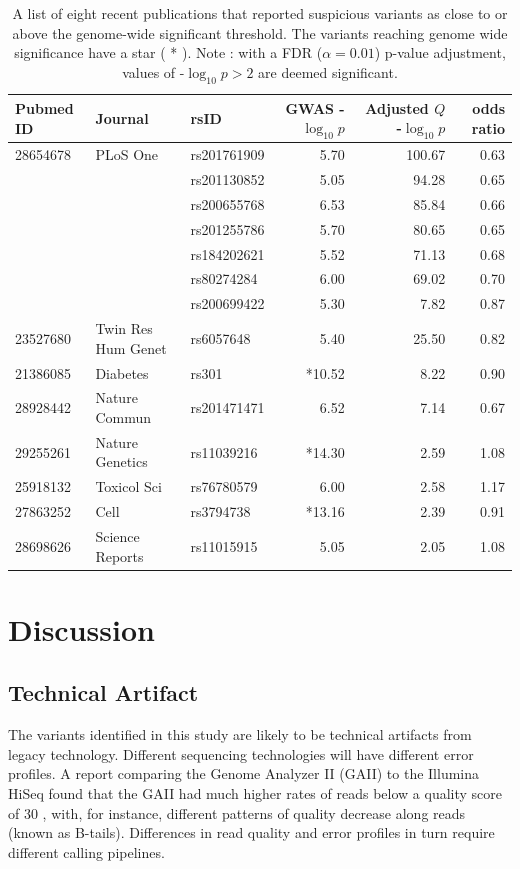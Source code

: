 \documentclass[9pt,lineno]{elife}
\begin{document}
\begin{table}[h]
\begin{tabular}{l l l r r r}
  {Pubmed ID}  & {Journal} & {rsID} & {GWAS -$\log_{10} p$} & {Adjusted $Q$ -$\log_{10} p$} & {odds ratio}     \\ \hline
 28654678	& PLoS One	& rs201761909	& 5.70	& 100.67 & 0.63\\
 	& 		& rs201130852	& 5.05	& 94.28 & 0.65\\
 	& 		& rs200655768	& 6.53	& 85.84 & 0.66\\
 	& 		& rs201255786	& 5.70	& 80.65 & 0.65\\	
 	& 		& rs184202621	& 5.52	& 71.13 & 0.68\\
	& 		& rs80274284	& 6.00	& 69.02 &  0.70\\
 	& 		& rs200699422	& 5.30	& 7.82 & 0.87\\ 
23527680 &	Twin Res Hum Genet	& rs6057648	& 5.40	& 25.50 & 0.82\\  
21386085 &	Diabetes &	rs301 &*10.52	 & 8.22 & 0.90\\
28928442	& Nature Commun	& rs201471471	& 6.52	& 7.14 & 0.67\\
29255261	& Nature Genetics	& rs11039216	& *14.30	& 2.59 & 1.08\\
25918132	& Toxicol Sci	& rs76780579	& 6.00	& 2.58	& 1.17 \\
27863252	& Cell	& rs3794738	& *13.16	& 2.39 & 0.91\\
28698626	& Science Reports	& rs11015915	& 5.05	& 2.05 & 1.08\\

 \hline
\end{tabular}
\caption{A list of eight recent publications that reported suspicious variants as close to or above the genome-wide significant threshold. The variants reaching genome wide significance have a star ( * ). Note : with a FDR ($\alpha = 0.01$) p-value adjustment, values of -$\log_{10} p > 2$ are deemed significant. }
\label{gwasTable}
\end{table}


\section{Discussion}

\subsection{Technical Artifact}
The variants identified in this study are likely to be technical artifacts from legacy technology.
Different sequencing technologies will have different error profiles. 
A report comparing the Genome Analyzer II (GAII) to the Illumina HiSeq found that the GAII had much higher rates of reads below a quality score of 30 \citep{Minoche2011}, with, for instance, different patterns of quality decrease along reads (known as B-tails). 
Differences in read quality and error profiles in turn require different calling pipelines.
\end{document}
